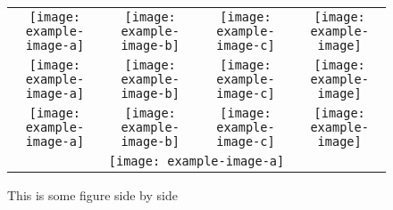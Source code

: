 \documentclass[a4paper,12pt]{article}
\begin{document}
\begin{figure}[htb]
\centering
  \begin{tabular}{@{}cccc@{}}
    \texttt{[image: example-image-a]} &
    \texttt{[image: example-image-b]} &
    \texttt{[image: example-image-c]} &
    \texttt{[image: example-image]}   \\
    \texttt{[image: example-image-a]} &
    \texttt{[image: example-image-b]} &
    \texttt{[image: example-image-c]} &
    \texttt{[image: example-image]}   \\
    \texttt{[image: example-image-a]} &
    \texttt{[image: example-image-b]} &
    \texttt{[image: example-image-c]} &
    \texttt{[image: example-image]}   \\
    \multicolumn{4}{c}{\texttt{[image: example-image-a]}}
  \end{tabular}
  \caption{This is   some figure side by side}
\end{figure}
\end{document}
